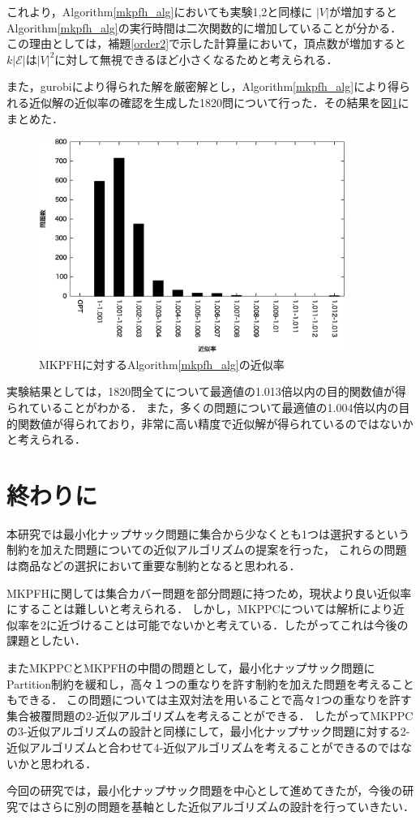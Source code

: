 \documentclass[11pt,dvipdfmx]{jarticle}
\numberwithin{equation}{section}
\begin{document}
            これより，Algorithm\ref{mkpfh_alg}においても実験1,2と同様に
            $|V|$が増加するとAlgorithm\ref{mkpfh_alg}の実行時間は二次関数的に増加していることが分かる．
            この理由としては，補題\ref{order2}で示した計算量において，頂点数が増加すると$k|\mathcal{E}|$は$|V|^2$に対して無視できるほど小さくなるためと考えられる．\par
            また，gurobiにより得られた解を厳密解とし，Algorithm\ref{mkpfh_alg}により得られる近似解の近似率の確認を生成した1820問について行った．その結果を図\ref{apx}にまとめた．\par
            \begin{figure}[htbp]
                \begin{center}
                    \includegraphics[width=100mm]{apx.eps}
                \end{center}
                \caption{MKPFHに対するAlgorithm\ref{mkpfh_alg}の近似率}
                \label{apx}
            \end{figure}
            実験結果としては，1820問全てについて最適値の1.013倍以内の目的関数値が得られていることがわかる．
            また，多くの問題について最適値の1.004倍以内の目的関数値が得られており，非常に高い精度で近似解が得られているのではないかと考えられる．
\section{終わりに}
    本研究では最小化ナップサック問題に集合から少なくとも1つは選択するという制約を加えた問題についての近似アルゴリズムの提案を行った，
    これらの問題は商品などの選択において重要な制約となると思われる．\par
    MKPFHに関しては集合カバー問題を部分問題に持つため，現状より良い近似率にすることは難しいと考えられる．
    しかし，MKPPCについては解析により近似率を2に近づけることは可能でないかと考えている．したがってこれは今後の課題としたい．\par
    またMKPPCとMKPFHの中間の問題として，最小化ナップサック問題にPartition制約を緩和し，高々１つの重なりを許す制約を加えた問題を考えることもできる．
    この問題については主双対法を用いることで高々1つの重なりを許す集合被覆問題の2-近似アルゴリズムを考えることができる．
    したがってMKPPCの3-近似アルゴリズムの設計と同様にして，最小化ナップサック問題に対する2-近似アルゴリズムと合わせて4-近似アルゴリズムを考えることができるのではないかと思われる．\par
    今回の研究では，最小化ナップサック問題を中心として進めてきたが，今後の研究ではさらに別の問題を基軸とした近似アルゴリズムの設計を行っていきたい．
\end{document}
